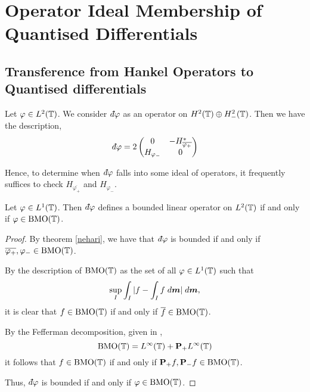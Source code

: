 
\chapter{Operator Ideal Membership of Quantised Differentials} %

\label{IdealMembership} %


\section{Transference from Hankel Operators to Quantised differentials}
Let $\varphi \in L^2(\mathbb{T})$. We consider $\qd \varphi$
as an operator on $H^2(\mathbb{T})\oplus H^2_-(\mathbb{T})$. Then we have the description,
\begin{equation}
    \qd \varphi = 2\begin{pmatrix}
        0 & -H_{\overline{\varphi_+}}^*\\
        H_{\varphi_-}  & 0
    \end{pmatrix}
\end{equation}

Hence, to determine when $\qd \varphi$ falls into some ideal of operators,
it frequently suffices to check $H_{\overline{\varphi_+}}$ and $H_{\varphi_-}$.

\begin{proposition}
    Let $\varphi \in L^1(\mathbb{T})$. Then $\qd \varphi$ defines a bounded
    linear operator on $L^2(\mathbb{T})$ if and only if $\varphi \in \operatorname{BMO}(\mathbb{T})$.
\end{proposition}
\begin{proof}
    By theorem \ref{nehari}, we have that $\qd \varphi$ is bounded
    if and only if $\overline{\varphi_+},\varphi_- \in \operatorname{BMO}(\mathbb{T})$. 
    
    By the description of $\operatorname{BMO}(\mathbb{T})$ as the set of all $\varphi \in L^1(\mathbb{T})$
    such that
    \begin{equation}
        \sup_{I} \int_{I} |f-\int_I f\;d\boldsymbol{m}| \;d\boldsymbol{m},
    \end{equation}
    it is clear that $f \in \operatorname{BMO}(\mathbb{T})$ if and only if $\overline{f} \in \operatorname{BMO}(\mathbb{T})$.
    
    By the Fefferman decomposition, given in \cite{Garnett},
    \begin{equation}
        \operatorname{BMO}(\mathbb{T}) = L^\infty(\mathbb{T})+\mathbf{P}_+L^\infty(\mathbb{T})
    \end{equation}
    it follows that $f \in \operatorname{BMO}(\mathbb{T})$ if and only if $\mathbf{P}_+f,\mathbf{P}_-f \in \operatorname{BMO}(\mathbb{T})$.
    
    Thus, $\qd \varphi$ is bounded if and only if $\varphi \in \operatorname{BMO}(\mathbb{T})$.
\end{proof}


